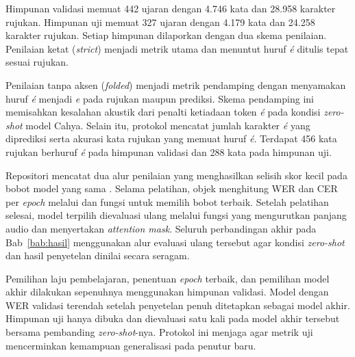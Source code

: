 Himpunan validasi memuat 442 ujaran dengan 4.746 kata dan 28.958 karakter rujukan. Himpunan uji memuat 327 ujaran dengan 4.179 kata dan 24.258 karakter rujukan. Setiap himpunan dilaporkan dengan dua skema penilaian. Penilaian ketat (\textit{strict}) menjadi metrik utama dan menuntut huruf \textit{é} ditulis tepat sesuai rujukan.

Penilaian tanpa aksen (\textit{folded}) menjadi metrik pendamping dengan menyamakan huruf \textit{é} menjadi \textit{e} pada rujukan maupun prediksi. Skema pendamping ini memisahkan kesalahan akustik dari penalti ketiadaan token \textit{é} pada kondisi \textit{zero-shot} model Cahya. Selain itu, protokol mencatat jumlah karakter \textit{é} yang diprediksi serta akurasi kata rujukan yang memuat huruf \textit{é}. Terdapat 456 kata rujukan berhuruf \textit{é} pada himpunan validasi dan 288 kata pada himpunan uji.

Repositori mencatat dua alur penilaian yang menghasilkan selisih skor kecil pada bobot model yang sama \cite{repoasr}. Selama pelatihan, objek  menghitung WER dan CER per \textit{epoch} melalui  dan fungsi  untuk memilih bobot terbaik. Setelah pelatihan selesai, model terpilih dievaluasi ulang melalui fungsi  yang mengurutkan panjang audio dan menyertakan \textit{attention mask}. Seluruh perbandingan akhir pada Bab~\ref{bab:hasil} menggunakan alur evaluasi ulang tersebut agar kondisi \textit{zero-shot} dan hasil penyetelan dinilai secara seragam.

Pemilihan laju pembelajaran, penentuan \textit{epoch} terbaik, dan pemilihan model akhir dilakukan sepenuhnya menggunakan himpunan validasi. Model dengan WER validasi terendah setelah penyetelan penuh ditetapkan sebagai model akhir. Himpunan uji hanya dibuka dan dievaluasi satu kali pada model akhir tersebut bersama pembanding \textit{zero-shot}-nya. Protokol ini menjaga agar metrik uji mencerminkan kemampuan generalisasi pada penutur baru.
